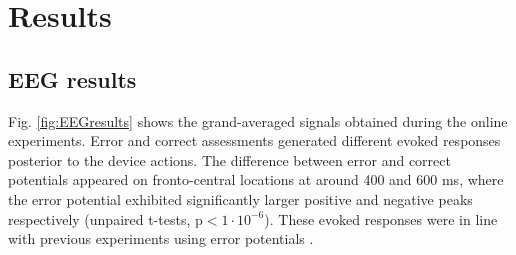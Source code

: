 \documentclass[10pt,letterpaper]{article}
\begin{document}
\section{Results}
\label{sec:results}

\subsection{EEG results} Fig. \ref{fig:EEGresults} shows the grand-averaged signals obtained during the online experiments. Error and correct assessments generated different evoked responses posterior to the device actions. The difference between error and correct potentials appeared on fronto-central locations at around 400 and 600 ms, where the error potential exhibited significantly larger positive and negative peaks respectively (unpaired t-tests, p$<1 \cdot 10^{-6}$). These evoked responses were in line with previous experiments using error potentials \cite{chavarriaga2010learning, iturrate13}.
\end{document}
